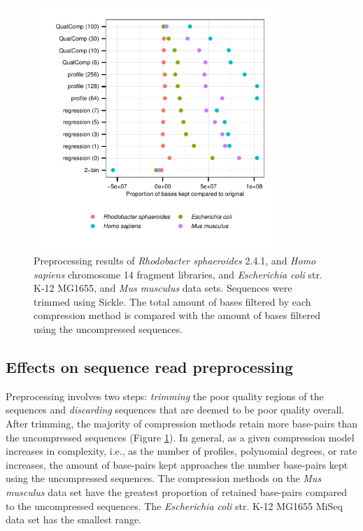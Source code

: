 \documentclass{bioinfo}
\begin{document}
\begin{figure}[!tbp]
\centerline{\includegraphics[width=3.65in]{preprocessing_results.pdf}}
\caption{Preprocessing results of \textit{Rhodobacter sphaeroides}
  2.4.1, and \textit{Homo sapiens} chromosome 14 fragment libraries,
  and \textit{Escherichia coli} str. K-12 MG1655, and \textit{Mus
    musculus} data sets. Sequences were trimmed using Sickle. The
  total amount of bases filtered by each compression method is
  compared with the amount of bases filtered using the uncompressed
  sequences.}
  \label{fig:preprocessing}
\end{figure}

\subsection{Effects on sequence read preprocessing}

Preprocessing involves two steps: \emph{trimming} the poor quality
regions of the sequences and \emph{discarding} sequences that are
deemed to be poor quality overall. After trimming, the majority of
compression methods retain more base-pairs than the uncompressed
sequences (Figure \ref{fig:preprocessing}). In general, as a given
compression model increases in complexity, i.e., as the number of
profiles, polynomial degrees, or rate increases, the amount of
base-pairs kept approaches the number base-pairs kept using the
uncompressed sequences. The compression methods on the \textit{Mus
  musculus} data set have the greatest proportion of retained
base-pairs compared to the uncompressed sequences. The
\textit{Escherichia coli} str. K-12 MG1655 MiSeq data set has the
smallest range.
\end{document}
